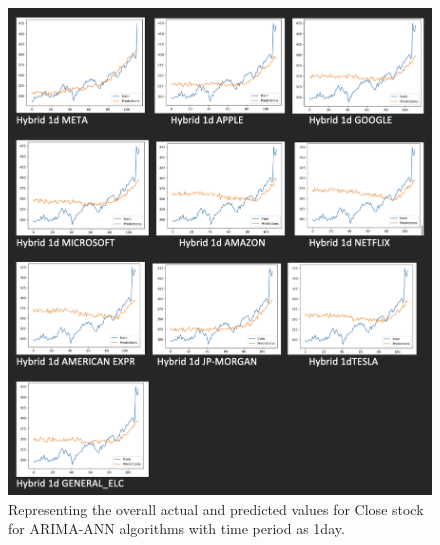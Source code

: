 \begin{figure}[ht]
    \centering
    \includegraphics[scale=0.2]{figures/Hybrid 1d.png}
    \caption{Representing the overall actual and predicted values for Close stock for ARIMA-ANN algorithms with time period as 1day.}
    \label{fig:chart_e}
\end{figure}

